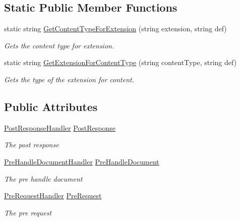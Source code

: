 \subsection*{Static Public Member Functions}
\begin{DoxyCompactItemize}
\item 
static string \hyperlink{class_html_agility_pack_1_1_html_web_a54df7f220aa98ea6306f8a9b8cae8926}{Get\+Content\+Type\+For\+Extension} (string extension, string def)
\begin{DoxyCompactList}\small\item\em Gets the content type for extension. \end{DoxyCompactList}\item 
static string \hyperlink{class_html_agility_pack_1_1_html_web_ae5c69da6ed02e1fdce6708e043e22483}{Get\+Extension\+For\+Content\+Type} (string content\+Type, string def)
\begin{DoxyCompactList}\small\item\em Gets the type of the extension for content. \end{DoxyCompactList}\end{DoxyCompactItemize}
\subsection*{Public Attributes}
\begin{DoxyCompactItemize}
\item 
\hyperlink{class_html_agility_pack_1_1_html_web_ad1e916ff2a7d0208601048ba15c2de45}{Post\+Response\+Handler} \hyperlink{class_html_agility_pack_1_1_html_web_a441d744d95ecd9fa8279d61001fa879c}{Post\+Response}
\begin{DoxyCompactList}\small\item\em The post response \end{DoxyCompactList}\item 
\hyperlink{class_html_agility_pack_1_1_html_web_a04fb9c8f6dd4672c86fcb4021008f64e}{Pre\+Handle\+Document\+Handler} \hyperlink{class_html_agility_pack_1_1_html_web_afbfe4a399f07b040f11d279a83140e7c}{Pre\+Handle\+Document}
\begin{DoxyCompactList}\small\item\em The pre handle document \end{DoxyCompactList}\item 
\hyperlink{class_html_agility_pack_1_1_html_web_a114ad10087064af08de4d4293847ef30}{Pre\+Request\+Handler} \hyperlink{class_html_agility_pack_1_1_html_web_af9f0c69c181ff9b265380ac656d42e60}{Pre\+Request}
\begin{DoxyCompactList}\small\item\em The pre request \end{DoxyCompactList}\end{DoxyCompactItemize}
